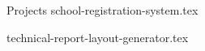 \begin{experienceSection}{Projects}
    {school-registration-system.tex}
    
    {technical-report-layout-generator.tex}
    


    
\end{experienceSection}